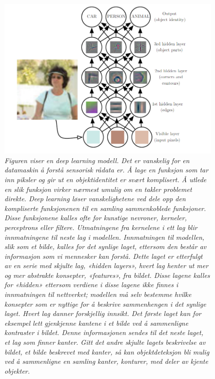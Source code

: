 \begin{figure} 
\begin{center} 
\includegraphics[scale=0.65]{figures/deep}
\caption{\small \sl Figuren viser en deep learning modell. Det er vanskelig for en datamaskin å forstå sensorisk rådata er. Å lage en funksjon som tar inn piksler og gir ut en objektidentitet er svært komplisert. Å utlede en slik funksjon virker nærmest umulig om en takler problemet direkte. Deep learning løser vanskelighetene ved dele opp den kompliserte funksjonenen til en samling sammenkoblede funksjoner. Disse funksjonene kalles ofte for kunstige nevroner, kerneler, perceptrons eller filtere. Utmatningene fra kernelene i ett lag blir innmatningene til neste lag i modellen. Innmatningen til modellen, slik som et bilde, kalles for det synlige laget, ettersom den består av informasjon som vi mennesker kan forstå. Dette laget er etterfulgt av en serie med skjulte lag, «hidden layers», hvert lag henter ut mer og mer abstrakte konsepter, «features», fra bildet. Disse lagene kalles for «hidden» ettersom verdiene i disse lagene ikke finnes i innmatningen til nettverket; modellen må selv bestemme hvilke konsepter som er nyttige for å beskrive sammenhengen i det synlige laget. Hvert lag danner forskjellig innsikt. Det første laget kan for eksempel lett gjenkjenne kantene i et bilde ved å sammenligne kontraster i bildet. Denne informasjonen sendes til det neste laget, et lag som finner kanter. Gitt det andre skjulte lagets beskrivelse av bildet, et bilde beskrevet med kanter, så kan objektdeteksjon bli mulig ved å sammenligne en samling kanter, konturer, med deler av kjente objekter. \cite{Goodfellow m.fl. 2016 s. 6} \label{fig:deep}} 
\end{center} 
\end{figure} 

